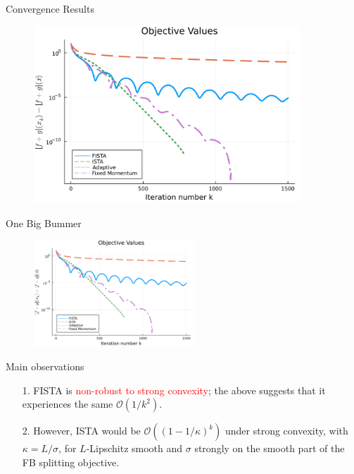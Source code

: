 \documentclass[11pt]{beamer}
\theoremstyle{definition}
\begin{document}
    \begin{frame}{Convergence Results}
        \begin{figure}
            \includegraphics[width=10cm]{Assets/obj_vals.png}
        \end{figure}
    \end{frame}
    \begin{frame}{One Big Bummer}
        \begin{figure}
            \includegraphics[width=6cm]{Assets/obj_vals.png}
        \end{figure}
        Main observations
        \begin{itemize}
            \item [1.] FISTA is \textcolor{red}{non-robust to strong convexity}; the above suggests that it experiences the same $\mathcal O (1/k^2)$. 
            \item [2.] However, ISTA would be $\mathcal O((1 - 1/\kappa)^k)$ under strong convexity, with $\kappa = L/\sigma$, for $L$-Lipschitz smooth and $\sigma$ strongly on the smooth part of the FB splitting objective. 
        \end{itemize}
    \end{frame}
        
    
\end{document}
